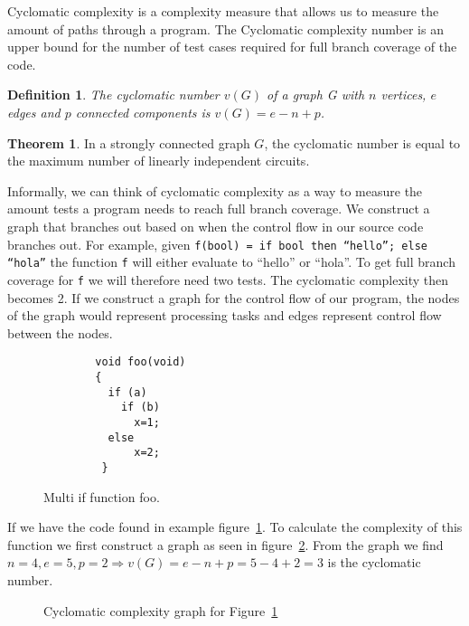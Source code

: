 \documentclass[12pt]{report}
\newtheorem*{definition}{Definition}
\theoremstyle{definition}
\newtheorem*{theorem}{Theorem}
\theoremstyle{theorem}
\begin{document}
Cyclomatic complexity is a complexity measure that allows us to measure the
amount of paths through a program. The Cyclomatic complexity number is an upper
bound for the number of test cases required for full branch coverage of the
code. 

\theoremstyle{definition}
\begin{definition}
The cyclomatic number $v(G)$ of a graph G with $n$ vertices, $e$ edges and $p$
connected components is $v(G) = e - n + p$.
\end{definition}

\begin{theorem}
In a strongly connected graph $G$, the cyclomatic number is equal to the
maximum number of linearly independent circuits.~\cite{McCabe}
\end{theorem}

Informally, we can think of cyclomatic complexity as a way to measure the amount
tests a program needs to reach full branch coverage. We construct a graph that
branches out based on when the control flow in our source code branches out. For
example, given \texttt{f(bool) = if bool then ``hello''; else ``hola''} the
function \texttt{f} will either evaluate to ``hello'' or ``hola''. To get full
branch coverage for \texttt{f} we will therefore need two tests. The cyclomatic
complexity then becomes 2. If we construct a graph for the control flow of our
program, the nodes of the graph would represent processing tasks and edges
represent control flow between the nodes. 

\begin{figure}[H]
    \begin{lstlisting}
        void foo(void)
        {
          if (a)
            if (b) 
              x=1;
          else
              x=2;
         }
    \end{lstlisting}
    \caption{Multi if function foo.}\label{c1excode}
\end{figure}

If we have the code found in example figure~\ref{c1excode}. To calculate the
complexity of this function we first construct a graph as seen in
figure~\ref{fig:c1exgraph}. From the graph we find $n=4, e=5, p=2\Rightarrow
v(G)=e-n+p=5-4+2=3$ is the cyclomatic number.

\begin{figure}[H]
    \centering
    \caption{Cyclomatic complexity graph for Figure~\ref{c1excode}}\label{fig:c1exgraph}
\end{figure}
\end{document}
